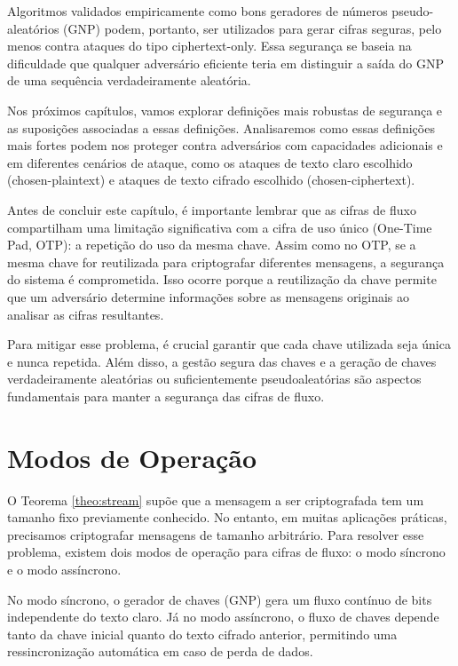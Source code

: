 Algoritmos validados empiricamente como bons geradores de números pseudo-aleatórios (GNP) podem, portanto, ser utilizados para gerar cifras seguras, pelo menos contra ataques do tipo ciphertext-only.
Essa segurança se baseia na dificuldade que qualquer adversário eficiente teria em distinguir a saída do GNP de uma sequência verdadeiramente aleatória.

Nos próximos capítulos, vamos explorar definições mais robustas de segurança e as suposições associadas a essas definições.
Analisaremos como essas definições mais fortes podem nos proteger contra adversários com capacidades adicionais e em diferentes cenários de ataque, como os ataques de texto claro escolhido (chosen-plaintext) e ataques de texto cifrado escolhido (chosen-ciphertext).

Antes de concluir este capítulo, é importante lembrar que as cifras de fluxo compartilham uma limitação significativa com a cifra de uso único (One-Time Pad, OTP):
a repetição do uso da mesma chave.
Assim como no OTP, se a mesma chave for reutilizada para criptografar diferentes mensagens, a segurança do sistema é comprometida.
Isso ocorre porque a reutilização da chave permite que um adversário determine informações sobre as mensagens originais ao analisar as cifras resultantes.

Para mitigar esse problema, é crucial garantir que cada chave utilizada seja única e nunca repetida.
Além disso, a gestão segura das chaves e a geração de chaves verdadeiramente aleatórias ou suficientemente pseudoaleatórias são aspectos fundamentais para manter a segurança das cifras de fluxo.

\section{Modos de Operação}
\label{sec:modos-de-operacao}

O Teorema \ref{theo:stream} supõe que a mensagem a ser criptografada tem um tamanho fixo previamente conhecido.
No entanto, em muitas aplicações práticas, precisamos criptografar mensagens de tamanho arbitrário.
Para resolver esse problema, existem dois modos de operação para cifras de fluxo: o modo síncrono e o modo assíncrono.

No modo síncrono, o gerador de chaves (GNP) gera um fluxo contínuo de bits independente do texto claro.
Já no modo assíncrono, o fluxo de chaves depende tanto da chave inicial quanto do texto cifrado anterior, permitindo uma ressincronização automática em caso de perda de dados.

